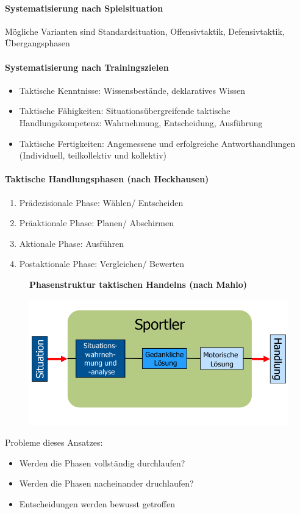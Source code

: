 \paragraph{Systematisierung nach Spielsituation} Mögliche Varianten sind Standardsituation, Offensivtaktik, Defensivtaktik, Übergangsphasen
\paragraph{Systematisierung nach Trainingszielen}
\begin{itemize}
  \item Taktische Kenntnisse: Wissensbestände, deklaratives Wissen
  \item Taktische Fähigkeiten: Situationsübergreifende taktische Handlungskompetenz: Wahrnehmung, Entscheidung, Ausführung
  \item Taktische Fertigkeiten: Angemessene und erfolgreiche Antworthandlungen (Individuell, teilkollektiv und kollektiv)
\end{itemize}
\paragraph{Taktische Handlungsphasen (nach Heckhausen)}
\begin{enumerate}
  \item Prädezisionale Phase: Wählen/ Entscheiden
  \item Präaktionale Phase: Planen/ Abschirmen
  \item Aktionale Phase: Ausführen
  \item Postaktionale Phase: Vergleichen/ Bewerten
\end{enumerate}
\begin{figure}[H]
  \begin{flushleft}
    \textbf{Phasenstruktur taktischen Handelns (nach Mahlo)}
  \end{flushleft}
  \centering
  \includegraphics[width=.7\textwidth]{pictures/taktik_phasenstruktur_des_handelns.png}
\end{figure}
Probleme dieses Ansatzes:
\begin{itemize}
  \item Werden die Phasen vollständig durchlaufen?
  \item Werden die Phasen nacheinander druchlaufen?
  \item Entscheidungen werden bewusst getroffen
\end{itemize}
